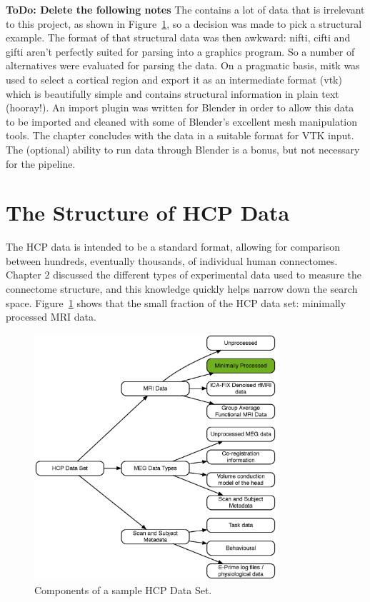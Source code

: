 \documentclass[MSc,paper=a4,pagesize=auto]{icldt}
\begin{document}
\textbf{ToDo: Delete the following notes}
The contains a lot of data that is irrelevant to this project, as shown in Figure~\ref{fig:hcp_full_data_set}, so a decision was made to pick a structural example.  The format of that structural data was then awkward: nifti, cifti and gifti aren't perfectly suited for parsing into a graphics program. So a number of alternatives were evaluated for parsing the data. On a pragmatic basis, mitk was used to select a cortical region and export it as an intermediate format (vtk) which is beautifully simple and contains structural information in plain text (hooray!). An import plugin was written for Blender in order to allow this data to be imported and cleaned with some of Blender's excellent mesh manipulation tools. The chapter concludes with the data in a suitable format for VTK input. The (optional) ability to run data through Blender is a bonus, but not necessary for the pipeline.

\section{The Structure of HCP Data} \label{sec:the_structure_of_hcp_data}
The HCP data is intended to be a standard format, allowing for comparison between hundreds, eventually thousands, of individual human connectomes. Chapter 2 discussed the different types of experimental data used to measure the connectome structure, and this knowledge quickly helps narrow down the search space. Figure~\ref{fig:hcp_full_data_set} shows that the small fraction of the HCP data set: minimally processed MRI data.  

\begin{figure}[htbp!]
    \centering
    \includegraphics[width=0.8\textwidth]{resources/hcp_full_data_set}
    \caption{Components of a sample HCP Data Set.}
    \label{fig:hcp_full_data_set}
\end{figure}
\end{document}
